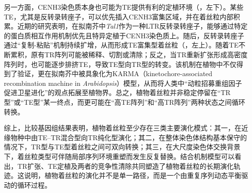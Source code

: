 另一方面，CENH3染色质本身也可能为TE提供有利的定植环境（，左下）。某些TE，尤其是反转录转座子，可以优先插入CENH3富集区域，并在着丝粒内部积累。近期的研究表明，在拟南芥中\textit{Tal1}作为一种LTR反转录转座子，能够通过特定的蛋白质相互作用机制优先且特异定植于CENH3染色质上\cite{tsukahara2025centrophilic}。随后，反转录转座子通过“复制-粘贴”机制持续扩增，从而形成TE富集型着丝粒（，左上）。随着TE不断累积，原有TR阵列可能被稀释、切割或清除；反之，当TR重新扩张形成高密度阵列时，也可能逐步排挤TE，导致TE型向TR型的转变。该机制在植物中不仅得到了验证，更在拟南芥中被具象化为KARMA（kinetochore-associated recombination machine in \textit{Arabidopsis}）模型\cite{wlodzimierz2023cycles}，从而将人类中“动粒招募重组因子促进卫星进化”的观点拓展至植物界。总之，植物着丝粒并非稳定停留在“TR型”或“TE型”某一终点，而更可能在“高TE阵列”和“高TR阵列”两种状态之间循环转换。


综上，比较基因组结果表明，植物着丝粒至少存在三类主要演化模式：其一，在近缘物种中由TE--TR混合型向TR纯化型演化；其二，在整体染色体结构基本保守的情况下，TR型与TE型着丝粒之间可双向转换；其三，在大尺度染色体交换背景下，着丝粒类型可伴随局部序列环境重塑而发生反复替换。结合机制模型可以看出，TR扩张、TE定植及两者的竞争性清除共同塑造了植物着丝粒的长期演化轨迹。这说明，植物着丝粒的演化并不是单一路径，而是一个由重复序列动态平衡驱动的循环过程。





